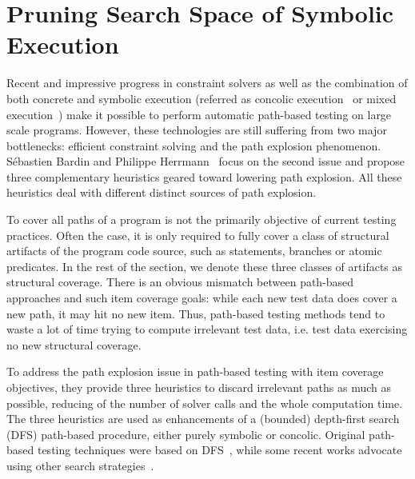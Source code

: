 \section{Pruning Search Space of Symbolic Execution}
Recent and impressive progress in constraint solvers as well as the combination of both concrete and symbolic execution (referred as concolic execution~\cite{cute,compositional} or mixed execution~\cite{mixed}) make it possible to perform automatic path-based testing on large scale programs. However, these technologies are still suffering from two major bottlenecks: efficient constraint solving and the path explosion phenomenon. S\'{e}bastien Bardin and Philippe Herrmann~\cite{prune} focus on the second issue and propose three complementary heuristics geared toward lowering path explosion. All these heuristics deal with different distinct sources of path explosion. 

To cover all paths of a program is not the primarily objective of current testing practices. Often the case, it is only required to fully cover a class of structural artifacts of the program code source, such as statements, branches or atomic predicates. In the rest of the section, we denote these three classes of artifacts as structural coverage. There is an obvious mismatch between path-based approaches and such item coverage goals: while each new test data does cover a new path, it may hit no new item. Thus, path-based testing methods tend to waste a lot of time trying to compute irrelevant test data, i.e. test data exercising no new structural coverage. 

To address the path explosion issue in path-based testing with item coverage objectives, they provide three heuristics to discard irrelevant paths as much as possible, reducing of the number of solver calls and the whole computation time. The three heuristics are used as enhancements of a (bounded) depth-first search (DFS) path-based procedure, either purely symbolic or concolic. Original path-based testing techniques were based on DFS~\cite{dart,cute, onthefly}, while some recent works advocate using other search strategies~\cite{exe,hybrid,fuzz}.


